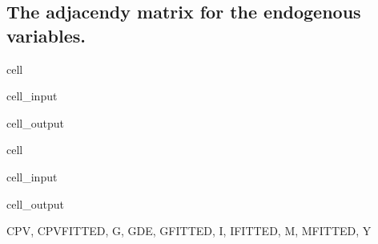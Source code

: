 \documentclass[letterpaper,10pt,english]{jupyterBook}
\begin{document}
\subsection{The adjacendy matrix for the endogenous variables.}
\label{\detokenize{content/howto/smallmodel/modelstart:the-adjacendy-matrix-for-the-endogenous-variables}}
\begin{sphinxuseclass}{cell}\begin{sphinxVerbatimInput}

\begin{sphinxuseclass}{cell_input}
\begin{sphinxVerbatim}[commandchars=\\\{\}]
\end{sphinxVerbatim}

\end{sphinxuseclass}\end{sphinxVerbatimInput}
\begin{sphinxVerbatimOutput}

\begin{sphinxuseclass}{cell_output}
\noindent{}

\end{sphinxuseclass}\end{sphinxVerbatimOutput}

\end{sphinxuseclass}
\begin{sphinxuseclass}{cell}\begin{sphinxVerbatimInput}

\begin{sphinxuseclass}{cell_input}
\begin{sphinxVerbatim}[commandchars=\\\{\}]
\end{sphinxVerbatim}

\end{sphinxuseclass}\end{sphinxVerbatimInput}
\begin{sphinxVerbatimOutput}

\begin{sphinxuseclass}{cell_output}
\begin{sphinxVerbatim}[commandchars=\\\{\}]
\PYGZob{}\PYGZsq{}CPV\PYGZsq{},
 \PYGZsq{}CPV\PYGZus{}FITTED\PYGZsq{},
 \PYGZsq{}G\PYGZsq{},
 \PYGZsq{}GDE\PYGZsq{},
 \PYGZsq{}G\PYGZus{}FITTED\PYGZsq{},
 \PYGZsq{}I\PYGZsq{},
 \PYGZsq{}I\PYGZus{}FITTED\PYGZsq{},
 \PYGZsq{}M\PYGZsq{},
 \PYGZsq{}M\PYGZus{}FITTED\PYGZsq{},
 \PYGZsq{}Y\PYGZsq{}\PYGZcb{}
\end{sphinxVerbatim}

\end{sphinxuseclass}\end{sphinxVerbatimOutput}

\end{sphinxuseclass}
\end{document}
